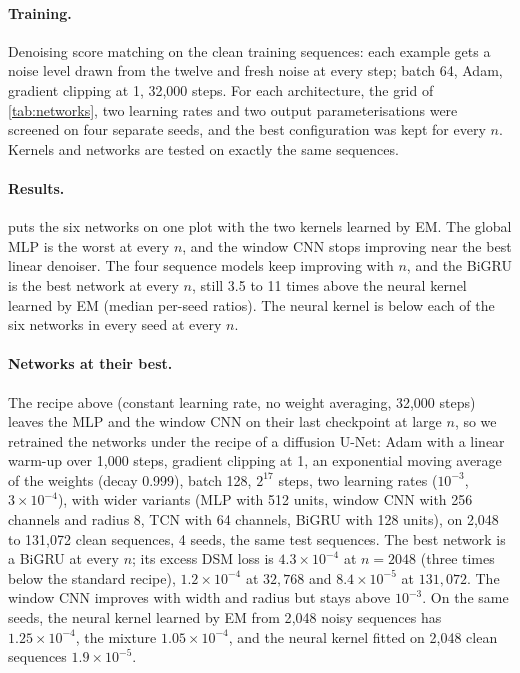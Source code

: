 \documentclass{article}
\begin{document}
\paragraph{Training.} Denoising score matching on the clean training sequences: each example gets a noise level drawn
from the twelve and fresh noise at every step; batch 64, Adam, gradient clipping at 1, 32{,}000 steps. For each
architecture, the grid of \cref{tab:networks}, two learning rates and two output parameterisations were screened on
four separate seeds, and the best configuration was kept for every $n$. Kernels and networks are tested on exactly the
same sequences.

\paragraph{Results.}  puts the six networks on one plot with the two kernels learned by EM. The
global MLP is the worst at every $n$, and the window CNN stops improving near the best linear denoiser. The four
sequence models keep improving with $n$, and the BiGRU is the best network at every $n$, still 3.5 to 11 times above
the neural kernel learned by EM (median per-seed ratios). The neural kernel is below each of the six networks in every
seed at every $n$.

\paragraph{Networks at their best.} The recipe above (constant learning rate, no weight averaging, 32{,}000 steps)
leaves the MLP and the window CNN on their last checkpoint at large $n$, so we retrained the networks under the recipe
of a diffusion U-Net: Adam with a linear warm-up over 1{,}000 steps, gradient clipping at 1, an exponential moving
average of the weights (decay 0.999), batch 128, $2^{17}$ steps, two learning rates ($10^{-3}$, $3\times10^{-4}$), with
wider variants (MLP with 512 units, window CNN with 256 channels and radius 8, TCN with 64 channels, BiGRU with 128
units), on 2{,}048 to 131{,}072 clean sequences, 4 seeds, the same test sequences. The best network is a BiGRU at every
$n$; its excess DSM loss is $4.3\times10^{-4}$ at $n=2048$ (three times below the standard recipe), $1.2\times10^{-4}$
at $32{,}768$ and $8.4\times10^{-5}$ at $131{,}072$. The window CNN improves with width and radius but stays above
$10^{-3}$. On the same seeds, the neural kernel learned by EM from 2{,}048 noisy sequences has $1.25\times10^{-4}$, the
mixture $1.05\times10^{-4}$, and the neural kernel fitted on 2{,}048 clean sequences $1.9\times10^{-5}$.
\end{document}
